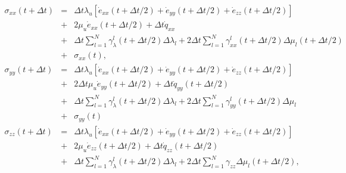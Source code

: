 \documentclass[11pt]{article}
\begin{document}
\begin{eqnarray}
  \sigma_{xx}(t+\Delta t) & = & \Delta t\lambda_u \left [\dot{e}_{xx}
                                (t+\Delta t/2) 
                            + \dot{e}_{yy}(t+\Delta t/2) + 
                              \dot{e}_{zz}(t+\Delta t/2)\right]\nonumber\\
                           & + & 2\mu_u \dot{e}_{xx}(t+\Delta t/2) 
                             +\Delta t\dot{q}_{xx} \nonumber\\
                           & + & \Delta t\sum_{l=1}^N\gamma^l_{\lambda}
                                 (t+\Delta t/2)\Delta\lambda_l  
                             +  2\Delta t\sum_{l=1}^N\gamma^l_{xx}
                               (t+\Delta t/2)\Delta\mu_l
                               (t+\Delta t/2)\nonumber\\ 
                           & + &\sigma_{xx}(t),\\
%
  \sigma_{yy}(t+\Delta t) & = & \Delta t\lambda_u \left [\dot{e}_{xx}
                                (t+\Delta t/2) 
                            + \dot{e}_{yy}(t+\Delta t/2) + 
                              \dot{e}_{zz}(t+\Delta t/2)\right]   \nonumber\\
                          & + & 2\Delta t \mu_u \dot{e}_{yy}
                                 (t+\Delta t/2) 
                            +   \Delta t \dot{q}_{yy}(t+\Delta t/2) \nonumber\\
                          & + & \Delta t\sum_{l=1}^N\gamma^l_{\lambda}
                                (t+\Delta t/2)\Delta\lambda_l  
                            +   2\Delta t\sum_{l=1}^N\gamma^l_{yy}
                               (t+\Delta t/2)\Delta\mu_l\\
                          & +& \sigma_{yy}(t) \\
%
  \sigma_{zz}(t+\Delta t) & = & \Delta t\lambda_u \left [\dot{e}_{xx}
                                (t+\Delta t/2) 
                            + \dot{e}_{yy}(t+\Delta t/2) 
                            + \dot{e}_{zz}(t+\Delta t/2)\right]   \nonumber\\
                          & + & 2\mu_u \dot{e}_{zz}(t+\Delta t/2) 
                            +\Delta t \dot{q}_{zz}(t+\Delta t/2)  \nonumber\\
                          & + & \Delta t\sum_{l=1}^N\gamma^l_{\lambda}
                                (t+\Delta t/2)\Delta\lambda_l   
                            +   2\Delta t\sum_{l=1}^N\gamma_{zz}\Delta\mu_l 
                                 (t+\Delta t/2)\nonumber, \\

\end{eqnarray}
\end{document}
